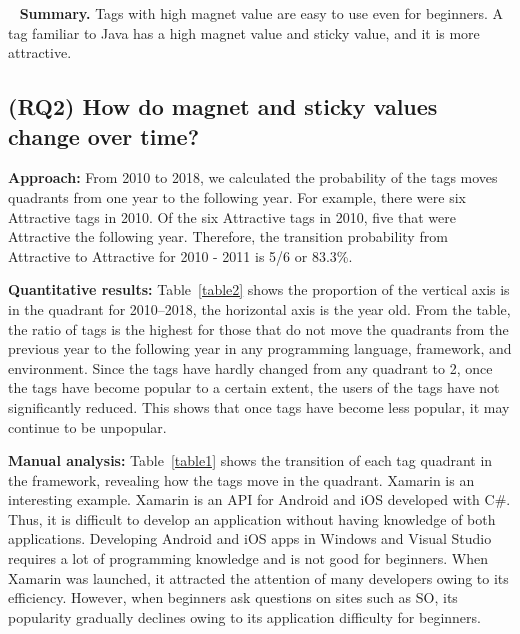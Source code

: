 \documentclass[english,preprint,JIP,technote]{ipsj}
\begin{document}
  
\noindent
\textbf{Summary.}
 Tags with high magnet value are easy to use even for beginners. A tag familiar to Java has a high magnet value and sticky value, and it is more attractive.


\subsection{(RQ2) How do magnet and sticky values change over time?} 

\noindent \textbf{Approach:}
From 2010 to 2018, we calculated the probability of the tags moves quadrants from one year to the following year. For example, there were six Attractive tags in 2010. Of the six Attractive tags in 2010, five that were Attractive the following year. Therefore, the transition probability from Attractive to Attractive for 2010 - 2011 is 5/6 or 83.3\%. 

\noindent \textbf{Quantitative results:}
Table~\ref{table2} shows the proportion of the vertical axis is in the quadrant for 2010–2018, the horizontal axis is the year old. From the table, the ratio of tags is the highest for those that do not move the quadrants from the previous year to the following year in any programming language, framework, and environment. Since the tags have hardly changed from any quadrant to 2, once the tags have become popular to a certain extent, the users of the tags have not significantly reduced. This shows that once tags have become less popular, it may continue to be unpopular.

\noindent \textbf{Manual analysis:}
Table~\ref{table1} shows the transition of each tag quadrant in the framework, revealing how the tags move in the quadrant. Xamarin is an interesting example. Xamarin is an API for Android and iOS developed with C\#. Thus, it is difficult to develop an application without having knowledge of both applications. Developing Android and iOS apps in Windows and Visual Studio requires a lot of programming knowledge and is not good for beginners. When Xamarin was launched, it attracted the attention of many developers owing to its efficiency. However, when beginners ask questions on sites such as SO, its popularity gradually declines owing to its application difficulty for beginners.
\end{document}
